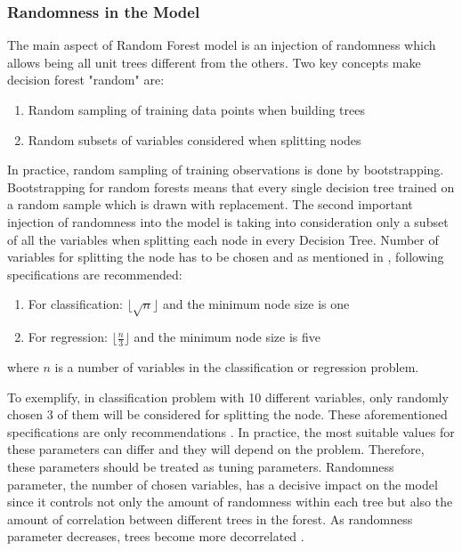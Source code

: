 \subsubsection{Randomness in the Model}
The main aspect of Random Forest model is an injection of randomness which allows being all unit trees different from the others. Two key concepts make decision forest "random" are:
\begin{enumerate}
	\item Random sampling of training data points when building trees
	\item Random subsets of variables considered when splitting nodes
\end{enumerate}

In practice, random sampling of training observations is done by bootstrapping. 
Bootstrapping for random forests means that every single decision tree trained on a random sample which is drawn with replacement. 
The second important injection of randomness into the model is taking into consideration only a subset of all the variables 
when splitting each node in every Decision Tree. 
Number of variables for splitting the node has to be chosen and 
as mentioned in \cite{friedman2001elements}, following specifications are recommended:
\begin{enumerate}
	\item For classification:  $\lfloor{\sqrt{n}} \rfloor$ and the minimum node size is one
	\item For regression: $\lfloor \frac{n}{3} \rfloor$ and the minimum node size is five
\end{enumerate}
where $n$ is a number of variables in the classification or regression problem. 

To exemplify, in classification problem with 10 different variables, only randomly chosen 3
of them will be considered for splitting the node. 
These aforementioned specifications are
only recommendations \cite{friedman2001elements}\cite{breiman2001random}. In practice, 
the most suitable values for these parameters
can differ and they will depend on the problem. Therefore, these parameters should be
treated as tuning parameters. Randomness parameter, the number of chosen variables,
has a decisive impact on the model since it controls not only the amount of randomness
within each tree but also the amount of correlation between different trees in the forest.
As randomness parameter decreases, trees become more decorrelated  \cite{criminisi2012decision}.


